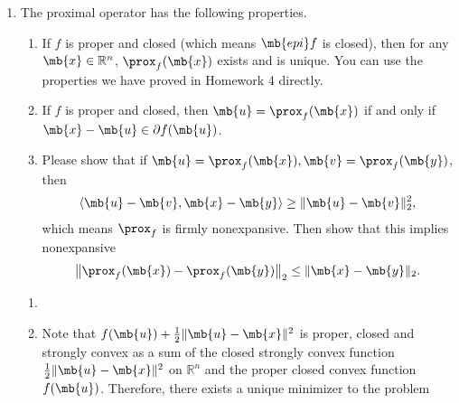 \begin{exercise}
\begin{enumerate}
        \item The proximal operator has the following properties.
            \begin{enumerate}
                \item If $f$ is proper and closed (which means $\mb{epi} f$ is closed), then for any $\mb{x}\in\mathbb{R}^n$, $\prox_{f}(\mb{x})$ exists and is unique. You can use the properties we have proved in Homework 4 directly.
                \item If $f$ is proper and closed, then $\mb{u}=\prox_{f}(\mb{x})$ if and only if $\mb{x}-\mb{u} \in \partial f(\mb{u})$.
                \item Please show that if $\mb{u}=\prox_{f}(\mb{x}), \mb{v}=\prox_{f}(\mb{y})$, then
                    \begin{align*}
                        \langle \mb{u}-\mb{v},\mb{x}-\mb{y}\rangle \ge\|\mb{u}-\mb{v}\|_2^2,
                    \end{align*}
                    which means $\prox_{f}$ is firmly nonexpansive. Then show that this implies nonexpansive
                    \begin{align*}
                        \left\|\prox_{f}(\mb{x})-\prox_{f}(\mb{y})\right\|_{2} \le\|\mb{x}-\mb{y}\|_{2}.
                    \end{align*}
            \end{enumerate}

            \begin{solution}
                \begin{enumerate}
                    \item []
                    \item Note that $f(\mb{u})+\frac{1}{2}\|\mb{u}-\mb{x}\|^2$ is proper, closed and strongly convex as a sum of the closed strongly convex function $\frac{1}{2}\|\mb{u}-\mb{x}\|^{2}$ on $\mathbb{R}^n$ and the proper closed convex function $f(\mb{u})$. Therefore, there exists a unique minimizer to the problem


\end{enumerate}
\end{solution}
\end{enumerate}
\end{exercise}
